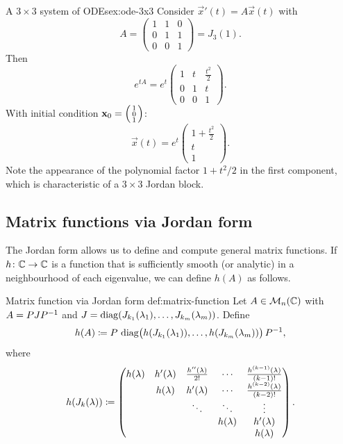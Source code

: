 \begin{example}{A $3 \times 3$ system of ODEs}{ex:ode-3x3}
Consider $\vec{x}'(t) = A\vec{x}(t)$ with
\[
  A = \begin{pmatrix} 1 & 1 & 0 \\ 0 & 1 & 1 \\ 0 & 0 & 1
  \end{pmatrix} = J_3(1).
\]
Then
\[
  e^{tA} = e^{t}
  \begin{pmatrix}
    1 & t & \tfrac{t^2}{2} \\
    0 & 1 & t \\
    0 & 0 & 1
  \end{pmatrix}.
\]
With initial condition
$\vec{x}_0 = \begin{psmallmatrix} 1\\0\\1 \end{psmallmatrix}$:
\[
  \vec{x}(t) = e^{t}
  \begin{pmatrix}
    1 + \tfrac{t^2}{2} \\
    t \\
    1
  \end{pmatrix}.
\]
Note the appearance of the polynomial factor $1 + t^2/2$ in the first
component, which is characteristic of a $3\times 3$ Jordan block.
\end{example}

\subsection{Matrix functions via Jordan form}%
\label{subsec:matrix-functions}


The Jordan form allows us to define and compute general matrix
functions.  If $h\colon \C \to \C$ is a function that is sufficiently
smooth (or analytic) in a neighbourhood of each eigenvalue, we can
define $h(A)$ as follows.

\begin{definition}{Matrix function via Jordan form}%
{def:matrix-function}
Let $A \in \Mat_n(\C)$ with $A = PJ\inv{P}$ and
$J = \diag(J_{k_1}(\lambda_1), \ldots, J_{k_m}(\lambda_m))$.
Define
\[
  h(A) \deff P\,\diag\bigl(h(J_{k_1}(\lambda_1)), \ldots,
    h(J_{k_m}(\lambda_m))\bigr)\,\inv{P},
\]
where
\[
  h(J_k(\lambda)) \deff
  \begin{pmatrix}
    h(\lambda) & h'(\lambda) & \frac{h''(\lambda)}{2!} & \cdots
      & \frac{h^{(k-1)}(\lambda)}{(k-1)!} \\
    & h(\lambda) & h'(\lambda) & \cdots
      & \frac{h^{(k-2)}(\lambda)}{(k-2)!} \\
    & & \ddots & \ddots & \vdots \\
    & & & h(\lambda) & h'(\lambda) \\
    & & & & h(\lambda)
  \end{pmatrix}.
\]
\end{definition}

